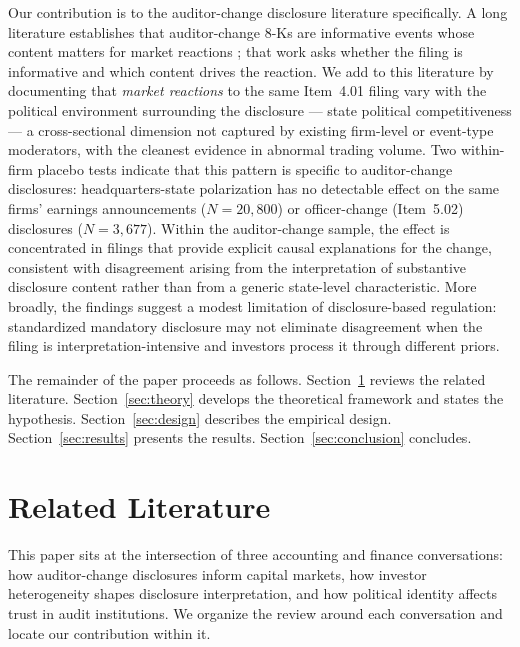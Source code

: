 \documentclass[12pt]{article}
\begin{document}
Our contribution is to the auditor-change disclosure literature
specifically. A long literature establishes that auditor-change 8-Ks are
informative events whose content matters for market reactions
\citep{johnson1990, dodd1984, defond1998, shu2000, landsman2009,
whisenant2003, hennes2014}; that work asks whether the filing is
informative and which content drives the reaction. We add to this
literature by documenting that \emph{market reactions} to the same
Item~4.01 filing vary with the political environment surrounding the
disclosure --- state political competitiveness --- a cross-sectional
dimension not captured by existing firm-level or event-type moderators,
with the cleanest evidence in abnormal trading volume. Two within-firm
placebo tests indicate that this pattern is specific to auditor-change
disclosures: headquarters-state polarization has no detectable effect on
the same firms' earnings announcements ($N = 20{,}800$) or
officer-change (Item~5.02) disclosures ($N = 3{,}677$). Within the
auditor-change sample, the effect is concentrated in filings that
provide explicit causal explanations for the change, consistent with
disagreement arising from the interpretation of substantive disclosure
content rather than from a generic state-level characteristic. More
broadly, the findings suggest a modest limitation of disclosure-based
regulation: standardized mandatory disclosure may not eliminate
disagreement when the filing is interpretation-intensive and investors
process it through different priors.

The remainder of the paper proceeds as follows. Section~\ref{sec:lit} reviews
the related literature. Section~\ref{sec:theory} develops the theoretical
framework and states the hypothesis.
Section~\ref{sec:design} describes the empirical design. Section~\ref{sec:results}
presents the results. Section~\ref{sec:conclusion} concludes.


\section{Related Literature}
\label{sec:lit}

This paper sits at the intersection of three accounting and finance
conversations: how auditor-change disclosures inform capital markets,
how investor heterogeneity shapes disclosure interpretation, and how
political identity affects trust in audit institutions. We organize the
review around each conversation and locate our contribution within it.
\end{document}
